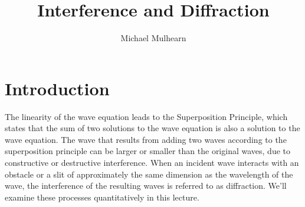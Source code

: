 \documentclass[12pt]{article}
\begin{document}
\newcommand{\pt}           {\ensuremath{ p_{\rm T} }}
\newcommand{\Et}           {\ensuremath{ E_{\rm t}     }}

\let\divsymb=\div %
\newcommand{\gv}[1]{\ensuremath{\mbox{\boldmath$ #1 $}}} 
\newcommand{\grad}[1]{\gv{\nabla} #1} %
\renewcommand{\div}[1]{\gv{\nabla} \cdot #1} %


\newcommand{\abs}[1]{\left| #1 \right|} %
\newcommand{\avg}[1]{\left< #1 \right>} %




\let\underdot=\d %
\renewcommand{\d}[2]{\frac{d #1}{d #2}} %
\newcommand{\dd}[2]{\frac{d^2 #1}{d #2^2}} %
\newcommand{\pd}[2]{\frac{\partial #1}{\partial #2}} %
\newcommand{\pdd}[2]{\frac{\partial^2 #1}{\partial #2^2}} %
\newcommand{\pdc}[3]{\left( \frac{\partial #1}{\partial #2} \right)_{#3}} %

\newcommand{\planewave}{e^{\textstyle i\vec{k} \cdot \vec{x}}}
\newcommand{\radialwave}{\frac{1}{r} \, e^{\textstyle ikr}} 

\title{Interference and Diffraction}
\author{Michael Mulhearn}

\maketitle

\section{Introduction}

The linearity of the wave equation leads to the Superposition
Principle, which states that the sum of two solutions to the wave
equation is also a solution to the wave equation.  The wave that
results from adding two waves according to the superposition principle
can be larger or smaller than the original waves, due to constructive
or destructive interference.  When an incident wave interacts with an
obstacle or a slit of approximately the same dimension as the
wavelength of the wave, the interference of the resulting waves is
referred to as diffraction.  We'll examine these processes
quantitatively in this lecture.
\end{document}
